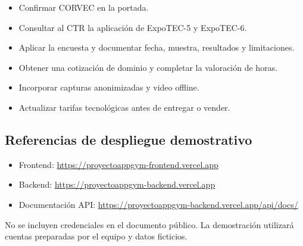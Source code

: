 \begin{itemize}
  \item Confirmar CORVEC en la portada.
  \item Consultar al CTR la aplicación de ExpoTEC-5 y ExpoTEC-6.
  \item Aplicar la encuesta y documentar fecha, muestra, resultados y limitaciones.
  \item Obtener una cotización de dominio y completar la valoración de horas.
  \item Incorporar capturas anonimizadas y video offline.
  \item Actualizar tarifas tecnológicas antes de entregar o vender.
\end{itemize}

\subsection{Referencias de despliegue demostrativo}

\begin{itemize}
  \item Frontend: \url{https://proyectoappgym-frontend.vercel.app}
  \item Backend: \url{https://proyectoappgym-backend.vercel.app}
  \item Documentación API: \url{https://proyectoappgym-backend.vercel.app/api/docs/}
\end{itemize}

No se incluyen credenciales en el documento público. La demostración utilizará
cuentas preparadas por el equipo y datos ficticios.
